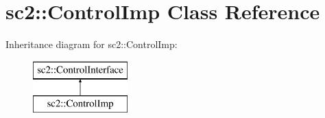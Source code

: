 \hypertarget{classsc2_1_1_control_imp}{}\section{sc2\+:\+:Control\+Imp Class Reference}
\label{classsc2_1_1_control_imp}
Inheritance diagram for sc2\+:\+:Control\+Imp\+:\begin{figure}[H]
\begin{center}
\leavevmode
\includegraphics[height=2.000000cm]{classsc2_1_1_control_imp}
\end{center}
\end{figure}
